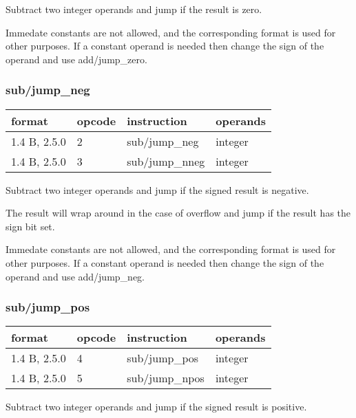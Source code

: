 \documentclass[forwardcom.tex]{subfiles}
\begin{document}
Subtract two integer operands and jump if the result is zero.
\vspace{2mm}

Immedate constants are not allowed, and the corresponding format is used for other purposes.
If a constant operand is needed then change the sign of the operand and use add/jump\_zero. 

\subsubsection{sub/jump\_neg}
\label{table:subJumpNegInstruction}
\begin{tabular}{|p{20mm}|p{12mm}|p{56mm}|p{50mm}|}
\hline
\bfseries format & \bfseries opcode & \bfseries instruction & \bfseries operands \\ \hline
1.4 B, 2.5.0 &  2 & sub/jump\_neg & integer \\ \hline
1.4 B, 2.5.0 &  3 & sub/jump\_nneg & integer\\ \hline
\end{tabular}
\vspace{2mm}

Subtract two integer operands and jump if the signed result is negative.

The result will wrap around in the case of overflow and jump if the result has the sign bit set.
\vspace{2mm}

Immedate constants are not allowed, and the corresponding format is used for other purposes.
If a constant operand is needed then change the sign of the operand and use add/jump\_neg. 

\subsubsection{sub/jump\_pos}
\label{table:subJumpPosInstruction}
\begin{tabular}{|p{20mm}|p{12mm}|p{56mm}|p{50mm}|}
\hline
\bfseries format & \bfseries opcode & \bfseries instruction & \bfseries operands \\ \hline
1.4 B, 2.5.0 &  4 & sub/jump\_pos & integer \\ \hline
1.4 B, 2.5.0 &  5 & sub/jump\_npos & integer\\ \hline
\end{tabular}
\vspace{2mm}

Subtract two integer operands and jump if the signed result is positive.
\end{document}
